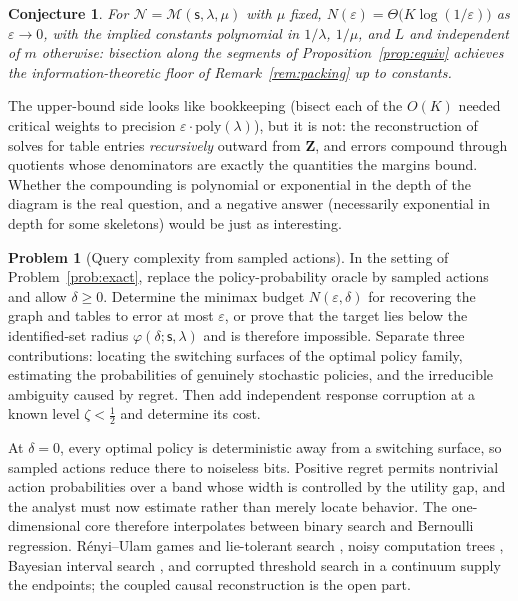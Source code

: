 \documentclass[11pt]{amsart}
\theoremstyle{plain}
\newtheorem{conjecture}[theorem]{Conjecture}
\theoremstyle{definition}
\newtheorem{problem}[theorem]{Problem}
\newcommand{\bZ}{\mathbf{Z}}
\newcommand{\MM}{\mathcal{M}}
\newcommand{\sk}{\mathsf{s}}
\begin{document}
\begin{conjecture}\label{conj:exact}
For $\mathcal{N}=\MM(\sk,\lambda,\mu)$ with $\mu$ fixed, $N(\varepsilon)=\Theta\bigl(K\log(1/\varepsilon)\bigr)$ as $\varepsilon\to0$, with the implied constants polynomial in $1/\lambda$, $1/\mu$, and $L$ and independent of $m$ otherwise: bisection along the segments of Proposition~\ref{prop:equiv} achieves the information-theoretic floor of Remark~\ref{rem:packing} up to constants.
\end{conjecture}

The upper-bound side looks like bookkeeping (bisect each of the $O(K)$ needed critical weights to precision $\varepsilon\cdot\mathrm{poly}(\lambda)$), but it is not: the reconstruction of \cite{richens2024} solves for table entries \emph{recursively} outward from $\bZ$, and errors compound through quotients whose denominators are exactly the quantities the margins bound. Whether the compounding is polynomial or exponential in the depth of the diagram is the real question, and a negative answer (necessarily exponential in depth for some skeletons) would be just as interesting.

\begin{problem}[Query complexity from sampled actions]\label{prob:noisy}
In the setting of Problem~\ref{prob:exact}, replace the policy-probability oracle by sampled actions and allow $\delta\ge0$. Determine the minimax budget $N(\varepsilon,\delta)$ for recovering the graph and tables to error at most $\varepsilon$, or prove that the target lies below the identified-set radius $\varphi(\delta;\sk,\lambda)$ and is therefore impossible. Separate three contributions: locating the switching surfaces of the optimal policy family, estimating the probabilities of genuinely stochastic policies, and the irreducible ambiguity caused by regret. Then add independent response corruption at a known level $\zeta<\tfrac12$ and determine its cost.
\end{problem}

At $\delta=0$, every optimal policy is deterministic away from a switching surface, so sampled actions reduce there to noiseless bits. Positive regret permits nontrivial action probabilities over a band whose width is controlled by the utility gap, and the analyst must now estimate rather than merely locate behavior. The one-dimensional core therefore interpolates between binary search and Bernoulli regression. R\'enyi--Ulam games and lie-tolerant search \cite{rivest1980}, noisy computation trees \cite{feige1994}, Bayesian interval search \cite{benor2008,karp2007}, and corrupted threshold search in a continuum \cite{krishnamurthy2021} supply the endpoints; the coupled causal reconstruction is the open part.
\end{document}
